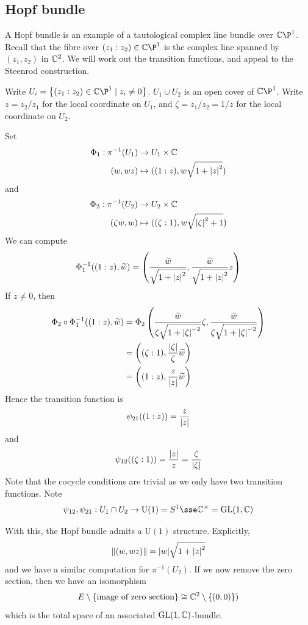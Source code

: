 \documentclass{article}
\begin{document}
\subsection{Hopf bundle}


A Hopf bundle is an example of a tautological complex line bundle over \(\C\P^1\). Recall that the fibre over \((z_1 : z_2) \in \C\P^1\) is the complex line spanned by \((z_1, z_2)\) in \(\mathbb{C}^2\). We will work out the transition functions, and appeal to the Steenrod construction.

Write \(U_i = \left\{(z_1 : z_2) \in \C\P^1 \mid z_i \ne 0\right\}\). \(U_1 \cup U_2\) is an open cover of \(\C\P^1\). Write \(z = z_2 / z_1\) for the local coordinate on \(U_1\), and \(\zeta = z_1/z_2 = 1/z\) for the local coordinate on \(U_2\).

Set
\begin{align*}
    \Phi_1 : \pi^{-1}(U_1) &\to U_1 \times \mathbb{C} \\
    (w, wz) &\mapsto ((1:z), w\sqrt{1 + \abs{z}^2})
\end{align*}
and
\begin{align*}
    \Phi_2 : \pi^{-1}(U_2) &\to U_2 \times \mathbb{C} \\
    (\zeta w, w) &\mapsto ((\zeta:1), w\sqrt{\abs{\zeta}^2 + 1})
\end{align*}
We can compute
\[\Phi_1^{-1}((1 : z), \widetilde w) = \left(\frac{\widetilde w}{\sqrt{1 + \abs{z}^2}}, \frac{\widetilde w}{\sqrt{1 + \abs{z}^2}}z\right)\]
If \(z \ne 0\), then
\begin{align*}
    \Phi_2 \circ \Phi_1^{-1}((1 : z), \widetilde w) &= \Phi_2\left(\frac{\widetilde w}{\zeta\sqrt{1 + \abs{\zeta}^{-2}}}\zeta,\frac{\widetilde w}{\zeta\sqrt{1 + \abs{\zeta}^{-2}}}\right) \\
    &= \left((\zeta: 1), \frac{\abs{\zeta}}{\zeta}\widetilde w\right) \\
    &= \left((1 : z), \frac{z}{\abs{z}}\widetilde w\right)
\end{align*}
Hence the transition function is
\[\psi_{21}((1 : z)) = \frac{z}{\abs{z}}\]
and
\[\psi_{12}((\zeta:1)) = \frac{\abs{z}}{z} = \frac{\zeta}{\abs{\zeta}}\]
Note that the cocycle conditions are trivial as we only have two transition functions. Note
\[\psi_{12}, \psi_{21} : U_1 \cap U_2 \to \mathrm U(1) = S^1 \sse \C^\times = \GL(1, \C)\]

With this, the Hopf bundle admits a \(\mathrm U(1)\) structure. Explicitly,
\[\norm{(w, wz)} = \abs{w}\sqrt{1 + \abs{z}^2}\]
and we have a similar computation for \(\pi^{-1}(U_2)\). If we now remove the zero section, then we have an isomorphism
\[E \setminus \{\text{image of zero section}\} \cong \mathbb{C}^2 \setminus \{(0, 0)\})\]
which is the total space of an associated \(\operatorname{GL}(1, \mathbb{C})\)-bundle.
\end{document}
